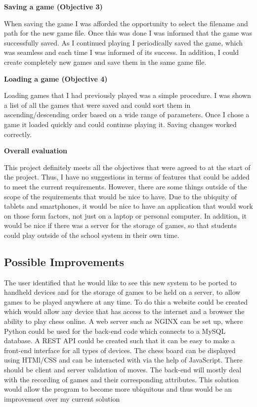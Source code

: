\textbf{Saving a game (Objective 3)}

When saving the game I was afforded the opportunity to select the filename and path for the new game file. Once this was done I was informed that the game was successfully saved. As I continued playing I periodically saved the game, which was seamless and each time I was informed of its success. In addition, I could create completely new games and save them in the same game file.

\textbf{Loading a game (Objective 4)}

Loading games that I had previously played was a simple procedure. I was shown a list of all the games that were saved and could sort them in ascending/descending order based on a wide range of parameters. Once I chose a game it loaded quickly and could continue playing it. Saving changes worked correctly.

\textbf{Overall evaluation}

This project definitely meets all the objectives that were agreed to at the start of the project. Thus, I have no suggestions in terms of features that could be added to meet the current requirements. However, there are some things outside of the scope of the requirements that would be nice to have. Due to the ubiquity of tablets and smartphones, it would be nice to have an application that would work on those form factors, not just on a laptop or personal computer. In addition, it would be nice if there was a server for the storage of games, so that students could play outside of the school system in their own time.
\subsection{Possible Improvements}
The user identified that he would like to see this new system to be ported to handheld devices and for the storage of games to be held on a server, to allow games to be played anywhere at any time. To do this a website could be created which would allow any device that has access to the internet and a browser the ability to play chess online. A web server such as NGINX can be set up, where Python could be used for the back-end code which connects to a MySQL database. A REST API could be created such that it can be easy to make a front-end interface for all types of devices. The chess board can be displayed using HTMl/CSS and can be interacted with via the help of JavaScript. There should be client and server validation of moves. The back-end will mostly deal with the recording of games and their corresponding attributes. This solution would allow the program to become more ubiquitous and thus would be an improvement over my current solution

